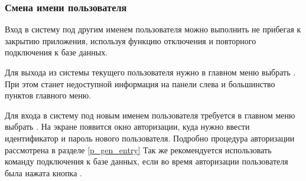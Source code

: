 \subsubsection{Смена имени пользователя} \label{p_gen_reentry}

Вход в систему под другим именем пользователя можно выполнить не прибегая к закрытию приложения, используя функцию отключения и повторного подключения к базе данных.

Для выхода из системы текущего пользователя нужно в главном меню выбрать . При этом станет недоступной информация на панели слева и большинство пунктов главного меню.

Для входа в систему под новым именем пользователя требуется в главном меню выбрать . На экране появится окно авторизации, куда нужно ввести идентификатор и пароль нового пользователя. Подробно процедура авторизации рассмотрена в разделе \ref{p_gen_entry} Так же рекомендуется использовать команду подключения к базе данных, если во время авторизации пользователя была нажата кнопка .
